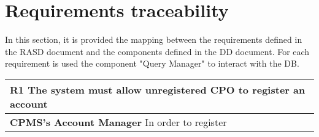 \section{Requirements traceability}
In this section, it is provided the mapping between the requirements defined in the RASD document and the components defined in the DD document.
For each requirement is used the component "Query Manager" to interact with the DB.

\begin{table}[H]
    \begin{tabularx}{\textwidth}{X}
        \toprule
        \textbf{R1} The system must allow unregistered CPO to register an account \\ \midrule
        \textbf{CPMS's Account Manager}  In order to register                     \\
    \end{tabularx}
\end{table}

